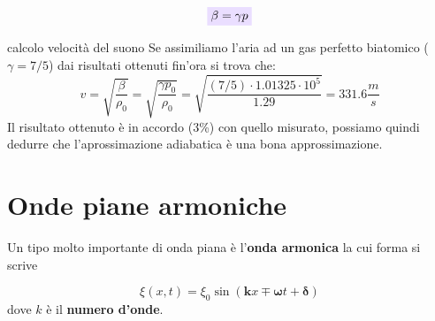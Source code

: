 \documentclass[x11names]{report}
\newcommand{\viola}[1]{\colorbox{yred}{$\displaystyle #1$}}
\begin{document}
	
	\begin{equation}
		\viola{\beta = \gamma p}
	\end{equation}
	
	\begin{es}{calcolo velocità del suono}
		Se assimiliamo l'aria ad un gas perfetto biatomico (\(\gamma = 7/5\)) dai risultati ottenuti fin'ora si trova che:
		\[ 
		v = \sqrt{\frac{\beta}{\rho_0}} = \sqrt{\frac{\gamma p_0}{\rho_0}} = \sqrt{\frac{(7/5)\cdot 1.01325\cdot 10^5}{1.29}} = 331.6 \frac{m}{s}
		\]
		Il risultato ottenuto è in accordo (3\%) con quello misurato, possiamo quindi dedurre che l'aprossimazione adiabatica è una bona approssimazione.
	\end{es}
	
	
	\newpage
	\section{Onde piane armoniche}
	Un tipo molto importante di onda piana è l'\textbf{onda armonica} la cui forma si scrive
	
	\[ 
	\xi(x,t) = \xi_0 \sin\left(\boldsymbol{k}x \mp \boldsymbol{\omega} t + \boldsymbol{\delta}\right)
	\]
	dove \(k\) è il \textbf{numero d'onde}.
	
\end{document}
